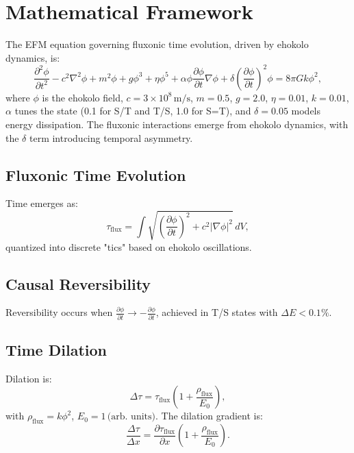 \documentclass[11pt]{article}
\begin{document}
\section{Mathematical Framework}
The EFM equation governing fluxonic time evolution, driven by ehokolo dynamics, is:
\begin{equation}
\frac{\partial^2 \phi}{\partial t^2} - c^2 \nabla^2 \phi + m^2 \phi + g \phi^3 + \eta \phi^5 + \alpha \phi \frac{\partial \phi}{\partial t} \nabla \phi + \delta \left(\frac{\partial \phi}{\partial t}\right)^2 \phi = 8 \pi G k \phi^2,
\end{equation}
where \(\phi\) is the ehokolo field, \(c = 3 \times 10^8 \, \text{m/s}\), \(m = 0.5\), \(g = 2.0\), \(\eta = 0.01\), \(k = 0.01\), \(\alpha\) tunes the state (0.1 for S/T and T/S, 1.0 for S=T), and \(\delta = 0.05\) models energy dissipation. The fluxonic interactions emerge from ehokolo dynamics, with the \(\delta\) term introducing temporal asymmetry.

\subsection{Fluxonic Time Evolution}
Time emerges as:
\begin{equation}
\tau_{\text{flux}} = \int \sqrt{\left(\frac{\partial \phi}{\partial t}\right)^2 + c^2 |\nabla \phi|^2} \, dV,
\end{equation}
quantized into discrete "tics" based on ehokolo oscillations.

\subsection{Causal Reversibility}
Reversibility occurs when \(\frac{\partial \phi}{\partial t} \to -\frac{\partial \phi}{\partial t}\), achieved in T/S states with \(\Delta E < 0.1\%\).

\subsection{Time Dilation}
Dilation is:
\begin{equation}
\Delta \tau = \tau_{\text{flux}} \left(1 + \frac{\rho_{\text{flux}}}{E_0}\right),
\end{equation}
with \(\rho_{\text{flux}} = k \phi^2\), \(E_0 = 1 \, \text{(arb. units)}\). The dilation gradient is:
\begin{equation}
\frac{\Delta \tau}{\Delta x} = \frac{\partial \tau_{\text{flux}}}{\partial x} \left(1 + \frac{\rho_{\text{flux}}}{E_0}\right).
\end{equation}
\end{document}
